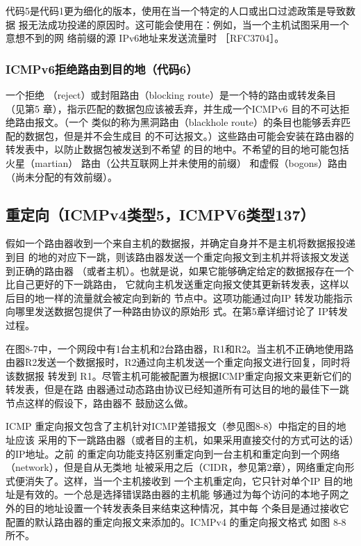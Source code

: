 代码5是代码1更为细化的版本，使用在当一个特定的人口或出口过滤政策是导致数据
报无法成功投递的原因时。这可能会使用在：例如，当一个主机试图采用一个意想不到的网
络前缀的源 IPv6地址来发送流量时 ［RFC3704］。

\subsubsection{ICMPv6拒绝路由到目的地（代码6）}
一个拒绝 （reject）或封阻路由（blocking route）是一个特的路由或转发条目（见第5
章），指示匹配的数据包应该被丢弃，并生成一个ICMPv6 目的不可达拒绝路由报文。（一个
类似的称为黑洞路由（blackhole route）的条目也能够丢弃匹配的数据包，但是并不会生成目
的不可达报文。）这些路由可能会安装在路由器的转发表中，以防止数据包被发送到不希望
的目的地中。不希望的目的地可能包括火星（martian） 路由（公共互联网上并未使用的前缀）
和虚假（bogons）路由（尚未分配的有效前缀）。

\subsection{重定向（ICMPv4类型5，ICMPV6类型137）}

假如一个路由器收到一个来自主机的数据报，并确定自身并不是主机将数据报投递到目
的地的对应下一跳，则该路由器发送一个重定向报文到主机并将该报文发送到正确的路由器
（或者主机）。也就是说，如果它能够确定给定的数据报存在一个比自己更好的下一跳路由，
它就向主机发送重定向报文使其更新转发表，这样以后目的地一样的流量就会被定向到新的
节点中。这项功能通过向IP 转发功能指示向哪里发送数据包提供了一种路由协议的原始形
式。在第5章详细讨论了 IP转发过程。

在图8-7中，一个网段中有1台主机和2台路由器，R1和R2。当主机不正确地使用路
由器R2发送一个数据报时，R2通过向主机发送一个重定向报文进行回复，同时将该数据报
转发到 R1。尽管主机可能被配置为根据ICMP重定向报文来更新它们的转发表，但是在路
由器通过动态路由协议已经知道所有可达目的地的最佳下一跳节点这样的假设下，路由器不
鼓励这么做。

ICMP 重定向报文包含了主机针对ICMP差错报文（参见图8-8）中指定的目的地址应该
采用的下一跳路由器（或者目的主机，如果采用直接交付的方式可达的话）的IP地址。之前
的重定向功能支持区别重定向到一台主机和重定向到一个网络（network），但是自从无类地
址被采用之后（CIDR，参见第2章），网络重定向形式便消失了。这样，当一个主机接收到
一个主机重定向，它只针对单个IP 目的地址是有效的。一个总是选择错误路由器的主机能
够通过为每个访问的本地子网之外的目的地址设置一个转发表条目来结束这种情况，其中每
个条目是通过接收它配置的默认路由器的重定向报文来添加的。ICMPv4 的重定向报文格式
如图 8-8 所不。

